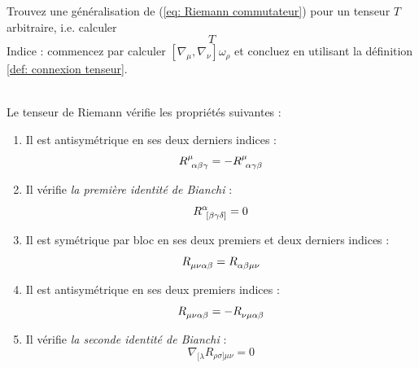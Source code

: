 \begin{exerc}
    Trouvez une généralisation de (\ref{eq: Riemann commutateur}) pour un tenseur $T$ arbitraire, i.e. calculer
    \begin{equation}
        [\nabla_\mu,\nabla_\nu] T
    \end{equation}
    Indice : commencez par calculer $[\nabla_\mu,\nabla_\nu] \omega_\rho$ et concluez en utilisant la définition \ref{def: connexion tenseur}.
\end{exerc}
\begin{theoremframe}
    \begin{propri}
        \label{prop:tenseur de Riemann}
        \,\\
        Le tenseur de Riemann vérifie les propriétés suivantes :
        \begin{enumerate}[label=\roman*.]
            \item Il est antisymétrique en ses deux derniers indices :
            \begin{equation}
                R\indices{^{\mu}_{\!\alpha \beta \gamma}} = -R\indices{^{\mu}_{\!\alpha \gamma \beta}}
            \end{equation}
            \item Il vérifie \emph{la première identité de Bianchi} :
            \begin{equation}
                R\indices{^{\alpha}_{\![\beta \gamma \delta]}} = 0
            \end{equation}
            \item Il est symétrique par bloc en ses deux premiers et deux derniers indices : 
            \begin{equation}
                R\indices{_{\mu \nu \alpha \beta}} = R\indices{_{\alpha \beta \mu \nu}}
             \end{equation}
            \item Il est antisymétrique en ses deux premiers indices : \begin{equation}
                R\indices{_{\mu \nu \alpha \beta}} = - R\indices{_{\nu \mu \alpha \beta}}
            \end{equation}
            \item Il vérifie \emph{la seconde identité de Bianchi} :
            \begin{equation}
                \nabla_{[\lambda} R_{\rho \sigma] \mu \nu} = 0
            \end{equation}
        \end{enumerate}
    \end{propri}
\end{theoremframe}
